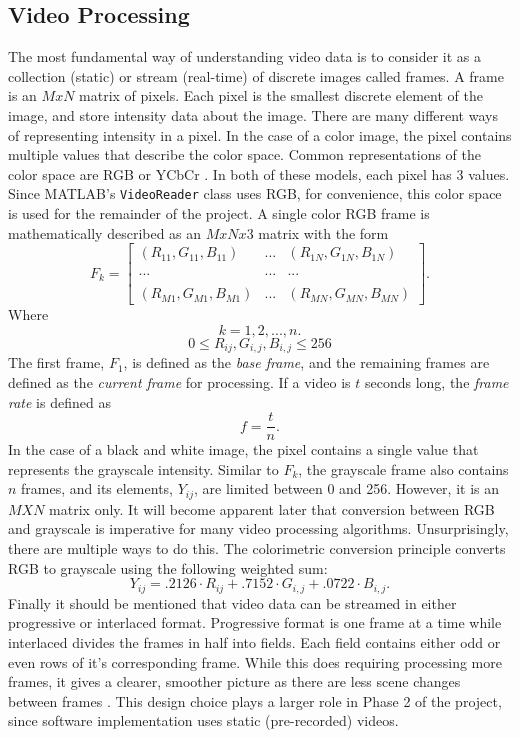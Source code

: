 \documentclass[11pt]{article} %
\begin{document}
\subsection{Video Processing}
\label{sec:vp}
The most fundamental way of understanding video data is to consider it as a collection (static) or stream (real-time) of discrete images called frames. A frame is an $MxN$ matrix of pixels. Each pixel is the smallest discrete element of the image, and store intensity data about the image. There are many different ways of representing intensity in a pixel. In the case of a color image, the pixel contains multiple values that describe the color space. Common representations of the color space are RGB or YCbCr \cite{1}. In both of these models, each pixel has 3 values.  Since MATLAB's \texttt{VideoReader} class uses RGB, for convenience, this color space is used for the remainder of the project. A single color RGB frame is mathematically described as an $MxNx3$ matrix with the form
\begin{equation}
F_k = 
\begin{bmatrix}
(R_{11}, G_{11}, B_{11}) & ... & (R_{1N}, G_{1N}, B_{1N}) \\
 & &\\
... & ... & ... \\
 & &\\
(R_{M1}, G_{M1}, B_{M1}) & ... & (R_{MN}, G_{MN}, B_{MN}) 
\end{bmatrix}
.
\end{equation}
Where
\[
k = 1, 2, ... , n.
\]
\[
0 \leq R_{ij}, G_{i,j}, B_{i,j} \leq 256
\]
The first frame, $F_1$, is defined as the \textit{base frame}, and the remaining frames are defined as the \textit{current frame} for processing. If a video is $t$ seconds long, the \textit{frame rate }is defined as
\begin{equation}
f = \frac{t}{n}.
\label{eq:framerate}
\end{equation}
In the case of a black and white image, the pixel contains a single value that represents the grayscale intensity. Similar to $F_k$, the grayscale frame also contains $n$ frames, and its elements, $Y_{ij}$, are limited between 0 and 256. However, it is an $MXN$ matrix only. It will become apparent later that conversion between RGB and grayscale is imperative for many video processing algorithms. Unsurprisingly, there are multiple ways to do this. The colorimetric conversion principle converts RGB to grayscale using the following weighted sum:
\begin{equation}
Y_{ij} = .2126 \cdot R_{ij} + .7152 \cdot G_{i,j} + .0722 \cdot B_{i,j}.
\end{equation}
Finally it should be mentioned that video data can be streamed in either progressive or interlaced format. Progressive format is one frame at a time while interlaced divides the frames in half into fields. Each field contains either odd or even rows of it's corresponding frame. While this does requiring processing more frames, it gives a clearer, smoother picture as there are less scene changes between frames \cite{1}. This design choice plays a larger role in Phase 2 of the project, since software implementation uses static (pre-recorded) videos.
\end{document}
